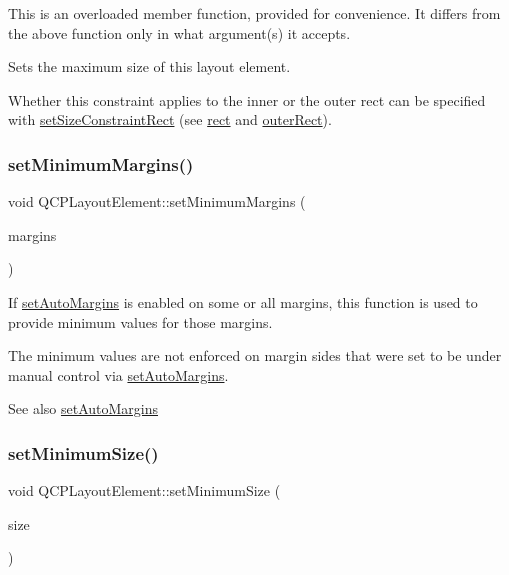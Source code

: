 This is an overloaded member function, provided for convenience. It differs from the above function only in what argument(s) it accepts.

Sets the maximum size of this layout element.

Whether this constraint applies to the inner or the outer rect can be specified with \hyperlink{classQCPLayoutElement_a361666cdcc6fbfd37344cc44be746b0f}{set\+Size\+Constraint\+Rect} (see \hyperlink{classQCPLayoutElement_a208effccfe2cca4a0eaf9393e60f2dd4}{rect} and \hyperlink{classQCPLayoutElement_a2a32a12a6161c9dffbadeb9cc585510c}{outer\+Rect}). \mbox{\label{classQCPLayoutElement_a0a8a17abc16b7923159fcc7608f94673}} 
\subsubsection{\texorpdfstring{set\+Minimum\+Margins()}{setMinimumMargins()}}
{\footnotesize\ttfamily void Q\+C\+P\+Layout\+Element\+::set\+Minimum\+Margins (\begin{DoxyParamCaption}\item[{const Q\+Margins \&}]{margins }\end{DoxyParamCaption})}

If \hyperlink{classQCPLayoutElement_accfda49994e3e6d51ed14504abf9d27d}{set\+Auto\+Margins} is enabled on some or all margins, this function is used to provide minimum values for those margins.

The minimum values are not enforced on margin sides that were set to be under manual control via \hyperlink{classQCPLayoutElement_accfda49994e3e6d51ed14504abf9d27d}{set\+Auto\+Margins}.

\begin{DoxySeeAlso}{See also}
\hyperlink{classQCPLayoutElement_accfda49994e3e6d51ed14504abf9d27d}{set\+Auto\+Margins} 
\end{DoxySeeAlso}
\mbox{\label{classQCPLayoutElement_a5dd29a3c8bc88440c97c06b67be7886b}} 
\subsubsection{\texorpdfstring{set\+Minimum\+Size()}{setMinimumSize()}\hspace{0.1cm}{\footnotesize\ttfamily [1/2]}}
{\footnotesize\ttfamily void Q\+C\+P\+Layout\+Element\+::set\+Minimum\+Size (\begin{DoxyParamCaption}\item[{const Q\+Size \&}]{size }\end{DoxyParamCaption})}

